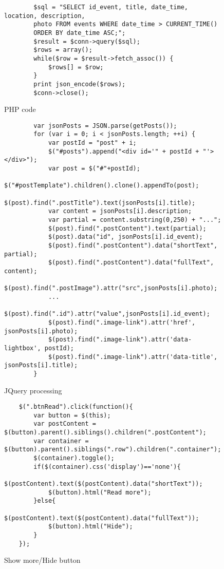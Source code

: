 \documentclass[a4paper]{article}
\begin{document}
	\begin{figure}
		\centering
		\begin{BVerbatim}
		$sql = "SELECT id_event, title, date_time, location, description, 
		photo FROM events WHERE date_time > CURRENT_TIME()
		ORDER BY date_time ASC;";
		$result = $conn->query($sql);
		$rows = array();
		while($row = $result->fetch_assoc()) {
			$rows[] = $row;
		}
		print json_encode($rows);
		$conn->close();
		\end{BVerbatim}
		\caption{PHP code}
		\label{fig:PHP}
	\end{figure}

	\begin{figure}
		\centering
		\begin{BVerbatim}
		var jsonPosts = JSON.parse(getPosts());
		for (var i = 0; i < jsonPosts.length; ++i) {
			var postId = "post" + i;
			$("#posts").append("<div id='" + postId + "'></div>");
			var post = $("#"+postId);
			$("#postTemplate").children().clone().appendTo(post);
			$(post).find(".postTitle").text(jsonPosts[i].title);
			var content = jsonPosts[i].description;
			var partial = content.substring(0,250) + "...";
			$(post).find(".postContent").text(partial);
			$(post).data("id", jsonPosts[i].id_event);
			$(post).find(".postContent").data("shortText", partial);
			$(post).find(".postContent").data("fullText", content);
			$(post).find(".postImage").attr("src",jsonPosts[i].photo);
			...
			$(post).find(".id").attr("value",jsonPosts[i].id_event);
			$(post).find(".image-link").attr('href', jsonPosts[i].photo);
			$(post).find(".image-link").attr('data-lightbox', postId);
			$(post).find(".image-link").attr('data-title', jsonPosts[i].title);
		}
		\end{BVerbatim}
		\caption{JQuery processing}
		\label{fig:JQuery}
	\end{figure}
	\begin{figure}
	\centering
	\begin{BVerbatim}
	$(".btnRead").click(function(){
		var button = $(this);
		var postContent = $(button).parent().siblings().children(".postContent");
		var container = $(button).parent().siblings(".row").children(".container");
		$(container).toggle(); 
		if($(container).css('display')=='none'){
			$(postContent).text($(postContent).data("shortText"));
			$(button).html("Read more");
		}else{
			$(postContent).text($(postContent).data("fullText"));
			$(button).html("Hide");
		}
	});
	\end{BVerbatim}
	\caption{Show more/Hide button}
	\label{fig:butt}
\end{figure}
\end{document}

